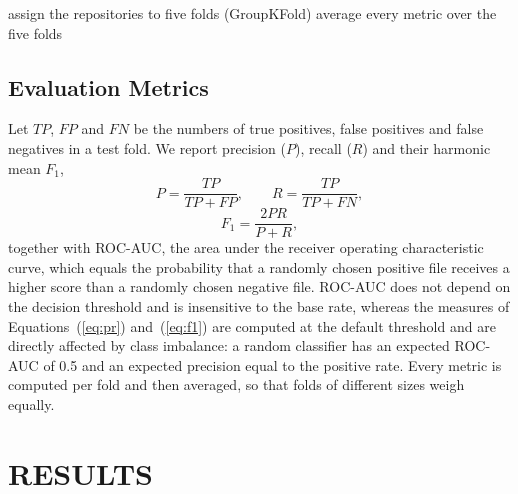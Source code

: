 \documentclass[a4paper,twoside]{article}
\begin{document}
\begin{algorithm}[t]
 \caption{Labeling and evaluation protocol.}\label{alg:protocol}
 assign the repositories to five folds (GroupKFold)\;
 average every metric over the five folds\;
\end{algorithm}

\subsection{Evaluation Metrics}

Let $\mathit{TP}$, $\mathit{FP}$ and $\mathit{FN}$ be the numbers of true positives, false positives and false negatives in a test fold. We report precision ($P$), recall ($R$) and their harmonic mean $F_1$,
\begin{equation}
P = \frac{\mathit{TP}}{\mathit{TP}+\mathit{FP}}, \qquad R = \frac{\mathit{TP}}{\mathit{TP}+\mathit{FN}},
\label{eq:pr}
\end{equation}
\begin{equation}
F_1 = \frac{2PR}{P+R},
\label{eq:f1}
\end{equation}
together with ROC-AUC, the area under the receiver operating characteristic curve, which equals the probability that a randomly chosen positive file receives a higher score than a randomly chosen negative file. ROC-AUC does not depend on the decision threshold and is insensitive to the base rate, whereas the measures of Equations~(\ref{eq:pr}) and~(\ref{eq:f1}) are computed at the default threshold and are directly affected by class imbalance: a random classifier has an expected ROC-AUC of 0.5 and an expected precision equal to the positive rate. Every metric is computed per fold and then averaged, so that folds of different sizes weigh equally.

\FloatBarrier
\section{\uppercase{Results}}
\label{sec:results}
\end{document}
